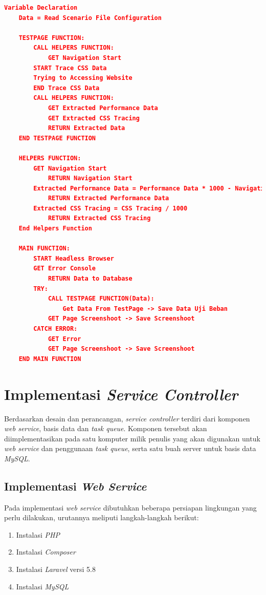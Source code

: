 	 	\begin{lstlisting}[frame=single,tabsize=2,breaklines,caption={\textit{Pseudocode Puppeteer}},label=pseudocodepupp, captionpos=b, language=json]
 	Variable Declaration
 	Data = Read Scenario File Configuration
 	
 	TESTPAGE FUNCTION:
 		CALL HELPERS FUNCTION:
 			GET Navigation Start
 		START Trace CSS Data
 		Trying to Accessing Website
 		END Trace CSS Data
 		CALL HELPERS FUNCTION:
 			GET Extracted Performance Data
 			GET Extracted CSS Tracing
 			RETURN Extracted Data
 	END TESTPAGE FUNCTION
 	
 	HELPERS FUNCTION:
 		GET Navigation Start
 			RETURN Navigation Start
 		Extracted Performance Data = Performance Data * 1000 - Navigation Start
 			RETURN Extracted Performance Data
 		Extracted CSS Tracing = CSS Tracing / 1000
 			RETURN Extracted CSS Tracing 
 	End Helpers Function
 	
 	MAIN FUNCTION:
 		START Headless Browser
 		GET Error Console
 			RETURN Data to Database
 		TRY:
 			CALL TESTPAGE FUNCTION(Data):
 				Get Data From TestPage -> Save Data Uji Beban
 			GET Page Screenshoot -> Save Screenshoot
 		CATCH ERROR:
 			GET Error
 			GET Page Screenshoot -> Save Screenshoot
 	END MAIN FUNCTION
	 	\end{lstlisting}
	
	\section{Implementasi \textit{Service Controller}}
		Berdasarkan desain dan perancangan, \textit{service controller} terdiri dari komponen \textit{web service}, basis data dan \textit{task queue}. Komponen tersebut akan diimplementasikan pada satu komputer milik penulis yang akan digunakan untuk \textit{web service} dan penggunaan \textit{task queue}, serta satu buah server untuk basis data \textit{MySQL}.
		
		\subsection{Implementasi \textit{Web Service}}
			Pada implementasi \textit{web service} dibutuhkan beberapa persiapan lingkungan yang perlu dilakukan, urutannya meliputi langkah-langkah berikut:
			\begin{enumerate}
				\item Instalasi \textit{PHP}
				\item Instalasi \textit{Composer}
				\item Instalasi \textit{Laravel} versi 5.8
				\item Instalasi \textit{MySQL}
			\end{enumerate}
			
